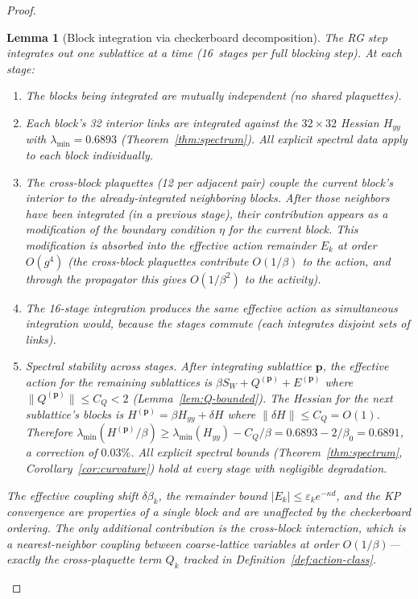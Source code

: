 \documentclass[11pt]{article}
\newtheorem{lemma}[theorem]{Lemma}
\theoremstyle{definition}
\begin{document}
\begin{proof}
\begin{lemma}[Block integration via checkerboard decomposition]
The RG step integrates out one sublattice at a time
(16~stages per full blocking step).  At each stage:
\begin{enumerate}[nosep]
\item The blocks being integrated are mutually independent
(no shared plaquettes).
\item Each block's 32 interior links are integrated against
the $32\times 32$ Hessian $H_{yy}$ with
$\lambda_{\min}=0.6893$ (Theorem~\ref{thm:spectrum}).
All explicit spectral data apply to each block individually.
\item The cross-block plaquettes (12 per adjacent pair) couple
the current block's interior to the \emph{already-integrated}
neighboring blocks.  After those neighbors have been integrated
(in a previous stage), their contribution appears as a
modification of the boundary condition $\eta$ for the
current block.  This modification is absorbed into the
effective action remainder $E_k$ at order $O(g^4)$
(the cross-block plaquettes contribute $O(1/\beta)$ to
the action, and through the propagator this gives
$O(1/\beta^2)$ to the activity).
\item The 16-stage integration produces the same effective
action as simultaneous integration would, because the stages
commute (each integrates disjoint sets of links).
\item \emph{Spectral stability across stages.}
After integrating sublattice $\mathbf{p}$, the effective
action for the remaining sublattices is
$\beta S_W+Q^{(\mathbf{p})}+E^{(\mathbf{p})}$
where $\|Q^{(\mathbf{p})}\|\le C_Q<2$
(Lemma~\ref{lem:Q-bounded}).
The Hessian for the next sublattice's blocks is
$H^{(\mathbf{p})}=\beta H_{yy}+\delta H$ where
$\|\delta H\|\le C_Q=O(1)$.
Therefore $\lambda_{\min}(H^{(\mathbf{p})}/\beta)
\ge\lambda_{\min}(H_{yy})-C_Q/\beta
=0.6893-2/\beta_0=0.6891$, a correction of $0.03\%$.
All explicit spectral bounds
(Theorem~\ref{thm:spectrum}, Corollary~\ref{cor:curvature})
hold at every stage with negligible degradation.
\end{enumerate}

The effective coupling shift $\delta\beta_k$, the remainder
bound $|E_k|\le\varepsilon_k e^{-\kappa d}$, and the KP
convergence are properties of a \emph{single block} and
are unaffected by the checkerboard ordering.
The only additional contribution is the cross-block interaction,
which is a nearest-neighbor coupling between coarse-lattice
variables at order $O(1/\beta)$---exactly the cross-plaquette
term $Q_k$ tracked in Definition~\ref{def:action-class}.
\end{lemma}


\end{proof}
\end{document}

